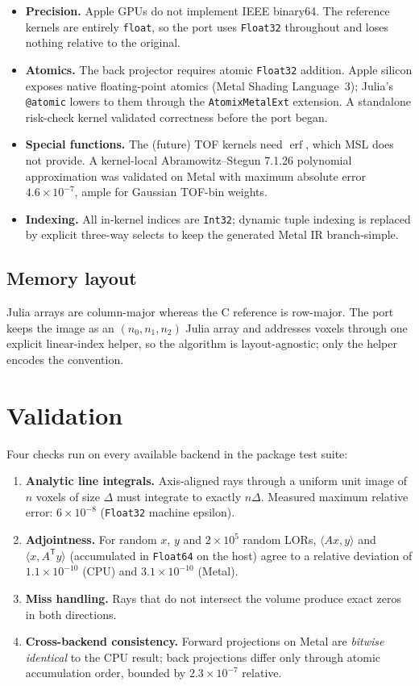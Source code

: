 \documentclass[11pt,a4paper]{article}
\begin{document}
\begin{itemize}
\item \textbf{Precision.} Apple GPUs do not implement IEEE binary64. The
  reference kernels are entirely \texttt{float}, so the port uses
  \texttt{Float32} throughout and loses nothing relative to the original.
\item \textbf{Atomics.} The back projector requires atomic \texttt{Float32}
  addition. Apple silicon exposes native floating-point atomics (Metal
  Shading Language~3); Julia's \texttt{@atomic} lowers to them through the
  \texttt{AtomixMetalExt} extension. A standalone risk-check kernel validated
  correctness before the port began.
\item \textbf{Special functions.} The (future) TOF kernels need
  $\operatorname{erf}$, which MSL does not provide. A kernel-local
  Abramowitz--Stegun 7.1.26 polynomial approximation was validated on Metal
  with maximum absolute error $4.6\times 10^{-7}$, ample for Gaussian TOF-bin
  weights.
\item \textbf{Indexing.} All in-kernel indices are \texttt{Int32}; dynamic
  tuple indexing is replaced by explicit three-way selects to keep the
  generated Metal IR branch-simple.
\end{itemize}

\subsection{Memory layout}

Julia arrays are column-major whereas the C reference is row-major. The port
keeps the image as an $(n_0, n_1, n_2)$ Julia array and addresses voxels
through one explicit linear-index helper, so the algorithm is
layout-agnostic; only the helper encodes the convention.

\section{Validation}

Four checks run on every available backend in the package test suite:
\begin{enumerate}
\item \textbf{Analytic line integrals.} Axis-aligned rays through a uniform
  unit image of $n$ voxels of size $\Delta$ must integrate to exactly
  $n\Delta$. Measured maximum relative error: $6\times 10^{-8}$
  (\texttt{Float32} machine epsilon).
\item \textbf{Adjointness.} For random $x$, $y$ and $2\times 10^5$ random
  LORs, $\langle Ax, y\rangle$ and $\langle x, A^{\mathsf T} y\rangle$
  (accumulated in \texttt{Float64} on the host) agree to a relative deviation
  of $1.1\times 10^{-10}$ (CPU) and $3.1\times 10^{-10}$ (Metal).
\item \textbf{Miss handling.} Rays that do not intersect the volume produce
  exact zeros in both directions.
\item \textbf{Cross-backend consistency.} Forward projections on Metal are
  \emph{bitwise identical} to the CPU result; back projections differ only
  through atomic accumulation order, bounded by $2.3\times 10^{-7}$ relative.
\end{enumerate}
\end{document}
